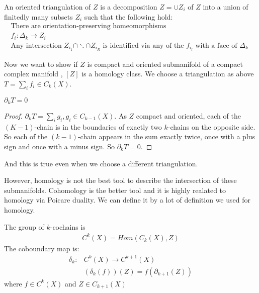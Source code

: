 \documentclass{article}
\begin{document}
\begin{df}
    An oriented triangulation of $Z$ is a decomposition $Z= \cup Z_{i}$ of $Z$ into a union of
    finitedly many subsets $Z_{i}$ such that the following hold:
    \begin{align*}
        \text{There are orientation-preserving homeomorphisms} \\
        f_{i} : \Delta_{k} \rightarrow Z_{i} \\
        \text{Any intersection $Z_{i_{1}}\cap \ddots \cap Z_{i_{R}}$ is identified via any of the 
        $f_{i_{l}}$ with a face of $\Delta_{k}$
        }
    \end{align*}

\end{df}

Now we want to show if $Z$ is compact and oriented submanifold of a compact complex manifold
, $[Z]$ is a homology class. We choose a triangulation as above $T = \sum_{i} f_{i} \in C_{k}(X)$. 

\begin{lm}
    $\partial_{k}T = 0$
\end{lm}

\begin{proof}
    $\partial_{k}T=\sum_{i}g_{i}, g_{i}\in C_{k-1}(X) $.  As $Z$ compact and oriented, each of the 
    $(K-1)$-chain is in the boundaries of exactly two $k$-chains on the opposite side. So each of the
    $(k-1)$-chain appears in the sum exactly twice, once with a plus sign and once with a minus sign.
    So $\partial_{k}T = 0$.
\end{proof}

And this is true even when we choose a different triangulation.

However, homology is not the best tool to describe the intersection of these submanifolds.
Cohomology is the better tool and it is highly realated to homology via Poicare duality. We can
define it by a lot of definition we used for homology.

\begin{df}
    The group of $k$-cochains is 
    \begin{align*}
        C^{k}(X) = Hom (C_{k}(X),Z)
    \end{align*}
    The coboundary map is:
    \begin{align*}
        \delta_{k} : & C^{k}(X) \rightarrow C^{k+1}(X) \\
                     & (\delta_{k}(f))(Z) = f(\partial_{k+1}(Z))
    \end{align*}
    where $f \in C^{k}(X)$ and $Z \in C_{k+1}(X)$
\end{df}
\end{document}
